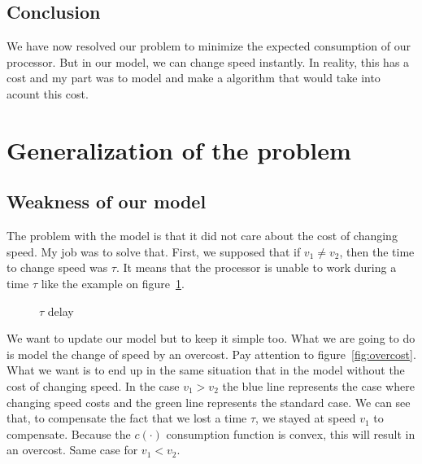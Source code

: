 \documentclass[
10pt, %
a4paper, %
oneside, %
headinclude,footinclude, %
BCOR5mm, %
]{scrartcl}
\begin{document}
\subsection{Conclusion}

We have now resolved our problem to minimize the expected consumption
of our processor. But in our model, we can change speed instantly. In
reality, this has a cost and my part was to model and make a algorithm
that would take into acount this cost.

\section{Generalization of the problem}

\subsection{Weakness of our model}
The problem with the model is that it did not care about the cost of
changing speed. My job was to solve that. First, we supposed that if
$v_1\neq v_2$, then the time to change speed was $\tau$. It means that
the processor is unable to work during a time $\tau$ like the example
on figure~\ref{fig:delay}.
\begin{figure}
  \centering
  \caption{$\tau$ delay}
  \label{fig:delay}
\end{figure}

We want to update our model but to keep it simple too. What we are
going to do is model the change of speed by an overcost. Pay attention
to figure~\ref{fig:overcost}. What we want is to end up in the same
situation that in the model without the cost of changing speed. In the
case $v_1>v_2$ the blue line represents the case where changing speed
costs and the green line represents the standard case. We can see
that, to compensate the fact that we lost a time $\tau$, we stayed at
speed $v_1$ to compensate. Because the $c(\cdot)$ consumption function
is convex, this will result in an overcost. Same case for $v_1<v_2$.\\
\end{document}
